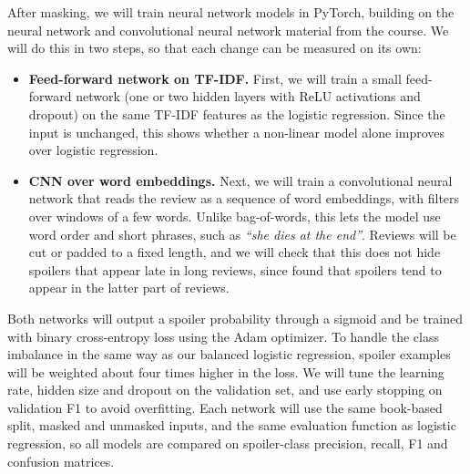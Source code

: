 \documentclass[11pt]{article}
\begin{document}
After masking, we will train neural network models in PyTorch, building on the neural network and convolutional neural network material from the course. We will do this in two steps, so that each change can be measured on its own:
\begin{itemize}
  \setlength\itemsep{0pt}
  \item \textbf{Feed-forward network on TF-IDF.} First, we will train a small feed-forward network (one or two hidden layers with ReLU activations and dropout) on the same TF-IDF features as the logistic regression. Since the input is unchanged, this shows whether a non-linear model alone improves over logistic regression.
  \item \textbf{CNN over word embeddings.} Next, we will train a convolutional neural network that reads the review as a sequence of word embeddings, with filters over windows of a few words. Unlike bag-of-words, this lets the model use word order and short phrases, such as \emph{``she dies at the end''}. Reviews will be cut or padded to a fixed length, and we will check that this does not hide spoilers that appear late in long reviews, since \citet{wan-etal-2019-fine} found that spoilers tend to appear in the latter part of reviews.
\end{itemize}
Both networks will output a spoiler probability through a sigmoid and be trained with binary cross-entropy loss using the Adam optimizer. To handle the class imbalance in the same way as our balanced logistic regression, spoiler examples will be weighted about four times higher in the loss. We will tune the learning rate, hidden size and dropout on the validation set, and use early stopping on validation F1 to avoid overfitting. Each network will use the same book-based split, masked and unmasked inputs, and the same evaluation function as logistic regression, so all models are compared on spoiler-class precision, recall, F1 and confusion matrices.




\end{document}
